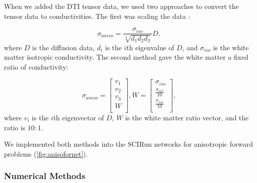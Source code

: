 When we added the DTI tensor data, we used two approaches to convert the tensor data to conductivities. The first was scaling the data \cite{ref:scaling}: 

\begin{equation}
\label{eq:scaling}
\sigma_{aniso} = \frac{\sigma_{iso}}{\sqrt[3]{d_1d_2d_3}}D,
\end{equation}
where $D$ is the diffusion data, $d_i$ is the $i$th eigenvalue of $D$, and $\sigma_{iso}$ is the white matter isotropic conductivity. The second method gave the white matter a fixed ratio of conductivity:

\begin{equation}
\label{eq:fixed}
\sigma_{aniso} = \begin{bmatrix}
v_1\\
v_2\\
v_3\\
W\\
\end{bmatrix}, 
W = \begin{bmatrix}
\sigma_{iso}\\
\frac{\sigma_{iso}}{10}\\
\frac{\sigma_{iso}}{10}\\
\end{bmatrix},
\end{equation}
where $v_i$ is the $i$th eigenvector of $D$, $W$ is the white matter ratio vector, and the ratio is $10:1$.

We implemented both methods into the SCIRun networks for anisotropic forward problems (\ref{fig:anisofornet}). 

\subsubsection{Numerical Methods}
\label{sec:numerical}


